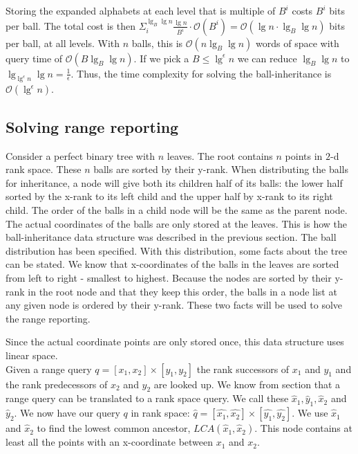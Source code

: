 Storing the expanded alphabets at each level that is multiple of $B^i$ costs $B^i$ bits per ball. The total cost is then $\Sigma^{\lg_B \lg n}_i \frac{\lg n}{B^i} \cdot \mathcal{O}(B^i) = \mathcal{O}(\lg n \cdot \lg_B \lg n)$ bits per ball, at all levels. With $n$ balls, this is $\mathcal{O}(n \lg_B \lg n)$ words of space with query time of $\mathcal{O}(B \lg_B \lg n)$. If we pick a $B \leq \lg^\epsilon n$ we can reduce $\lg_B \lg n$ to $\lg_{\lg^\epsilon n} \lg n = \frac{1}{\epsilon}$. Thus, the time complexity for solving the ball-inheritance is $\mathcal{O}(\lg^\epsilon n)$. 



\subsection{Solving range reporting}

Consider a perfect binary tree with $n$ leaves. The root contains $n$ points in $2$-d rank space. These $n$ balls are sorted by their y-rank. When distributing the balls for inheritance, a node will give both its children half of its balls: the lower half sorted by the x-rank to its left child and the upper half by x-rank to its right child. The order of the balls in a child node will be the same as the parent node. The actual coordinates of the balls are only stored at the leaves. This is how the ball-inheritance data structure was described in the previous section. The ball distribution has been specified. With this distribution, some facts about the tree can be stated. We know that x-coordinates of the balls in the leaves are sorted from left to right - smallest to highest. Because the nodes are sorted by their y-rank in the root node and that they keep this order, the balls in a node list at any given node is ordered by their y-rank. These two facts will be used to solve the range reporting.

Since the actual coordinate points are only stored once, this data structure uses linear space. \\

Given a range query $q = [x_1, x_2] \times [y_1, y_2]$ the rank successors of $x_1$ and $y_1$ and the rank predecessors of $x_2$ and $y_2$ are looked up. We know from section  that a range query can be translated to a rank space query. We call these $\hat{x}_1, \hat{y}_1, \hat{x}_2$ and $\hat{y}_2$. We now have our query $q$ in rank space: $\hat{q} = [\hat{x_1}, \hat{x_2}] \times [\hat{y_1}, \hat{y_2}]$. We use $\hat{x}_1$ and $\hat{x}_2$ to find the lowest common ancestor, $LCA(\hat{x}_1, \hat{x}_2)$. This node contains at least all the points with an x-coordinate between $x_1$ and $x_2$. \\

